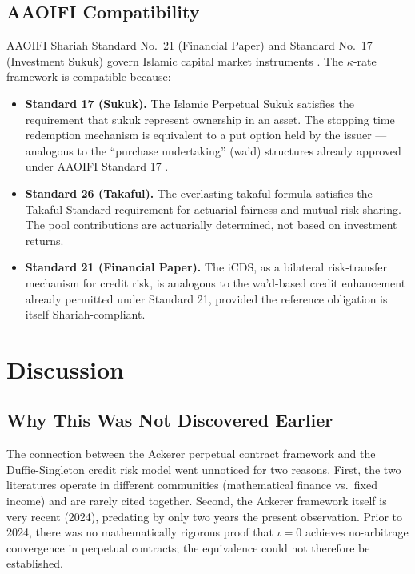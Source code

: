 \documentclass[10pt,twocolumn]{article}
\theoremstyle{plain}
\theoremstyle{definition}
\begin{document}
\subsection{AAOIFI Compatibility}

AAOIFI Shariah Standard No.~21 (Financial Paper) and
Standard No.~17 (Investment Sukuk) govern Islamic capital market
instruments \cite{AAOIFI2017}. The $\kappa$-rate framework is
compatible because:
\begin{itemize}[leftmargin=*,noitemsep]
\item \textbf{Standard 17 (Sukuk).} The Islamic Perpetual Sukuk
satisfies the requirement that sukuk represent ownership in
an asset. The stopping time redemption mechanism is equivalent
to a put option held by the issuer --- analogous to the
``purchase undertaking'' (wa'd) structures already approved
under AAOIFI Standard 17 \cite{AdamThomas2004}.
\item \textbf{Standard 26 (Takaful).} The everlasting takaful
formula satisfies the Takaful Standard requirement for actuarial
fairness and mutual risk-sharing. The pool contributions are
actuarially determined, not based on investment returns.
\item \textbf{Standard 21 (Financial Paper).} The iCDS, as a
bilateral risk-transfer mechanism for credit risk, is analogous
to the wa'd-based credit enhancement already permitted under
Standard 21, provided the reference obligation is itself
Shariah-compliant.
\end{itemize}

\section{Discussion}
\label{sec:discussion}

\subsection{Why This Was Not Discovered Earlier}

The connection between the Ackerer perpetual contract framework
and the Duffie-Singleton credit risk model went unnoticed for
two reasons. First, the two literatures operate in different
communities (mathematical finance vs.\ fixed income) and are
rarely cited together. Second, the Ackerer framework itself is
very recent (2024), predating by only two years the present
observation. Prior to 2024, there was no mathematically rigorous
proof that $\iota = 0$ achieves no-arbitrage convergence in
perpetual contracts; the equivalence could not therefore be
established.
\end{document}
